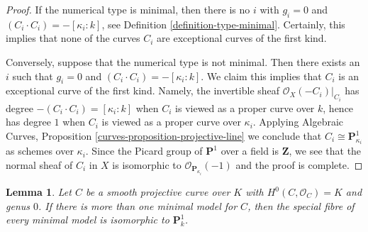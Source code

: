 \documentclass[10pt,a4paper]{amsart}
\theoremstyle{plain}
\newtheorem{lemma}[subsection]{Lemma}
\theoremstyle{definition}
\theoremstyle{remark}
\numberwithin{equation}{subsection}
\begin{document}
\begin{proof}
If the numerical type is minimal, then there is no $i$ with
$g_i = 0$ and $(C_i \cdot C_i) = -[\kappa_i: k]$, see
Definition \ref{definition-type-minimal}.
Certainly, this implies that none of the curves $C_i$
are exceptional curves of the first kind.

\medskip\noindent
Conversely, suppose that the numerical type is not minimal.
Then there exists an $i$ such that $g_i = 0$ and
$(C_i \cdot C_i) = -[\kappa_i: k]$.
We claim this implies that $C_i$ is an exceptional curve
of the first kind. Namely, the invertible sheaf
$\mathcal{O}_X(-C_i)|_{C_i}$ has degree $-(C_i \cdot C_i) = [\kappa_i : k]$
when $C_i$ is viewed as a proper curve over $k$, hence
has degree $1$ when $C_i$ is viewed as a proper curve over $\kappa_i$.
Applying
Algebraic Curves, Proposition \ref{curves-proposition-projective-line}
we conclude that $C_i \cong \mathbf{P}^1_{\kappa_i}$ as schemes
over $\kappa_i$. Since the Picard group of $\mathbf{P}^1$
over a field is $\mathbf{Z}$, we see that the normal sheaf
of $C_i$ in $X$ is isomorphic to $\mathcal{O}_{\mathbf{P}_{\kappa_i}}(-1)$
and the proof is complete.
\end{proof}

\begin{lemma}
\label{lemma-nonuniqueness}
Let $C$ be a smooth projective curve over $K$ with $H^0(C, \mathcal{O}_C) = K$
and genus $0$. If there is more than one minimal model for $C$, then
the special fibre of every minimal model is isomorphic to $\mathbf{P}^1_k$.
\end{lemma}
\end{document}
